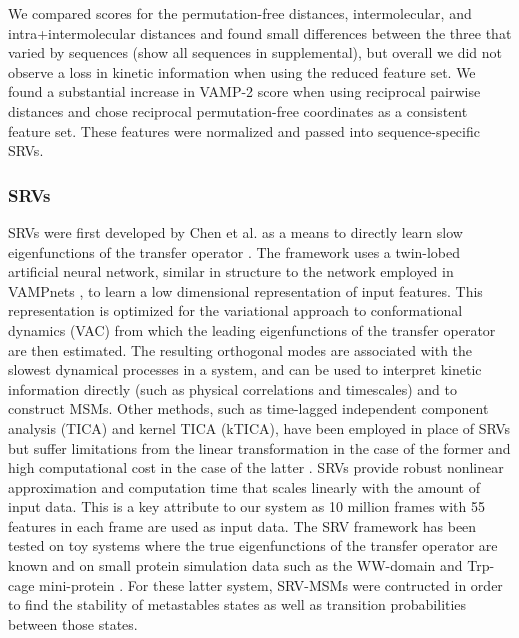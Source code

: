 \documentclass[journal=jpcbfk,manuscript=article]{achemso}
\begin{document}
We compared scores for the permutation-free distances, intermolecular, and intra+intermolecular distances and found small differences between the three that varied by sequences (show all sequences in supplemental), but overall we did not observe a loss in kinetic information when using the reduced feature set. We found a substantial increase in VAMP-2 score when using reciprocal pairwise distances and chose reciprocal permutation-free coordinates as a consistent feature set. These features were normalized and passed into sequence-specific SRVs. 


\subsubsection{\label{sec:methods}SRVs}
 
SRVs were first developed by Chen et al. as a means to directly learn slow eigenfunctions of the transfer operator \citep{Chen}. The framework uses a twin-lobed artificial neural network, similar in structure to the network employed in VAMPnets \citep{Mardt2018VAMPnetsKinetics}, to learn a low dimensional representation of input features. This representation is optimized for the variational approach to conformational dynamics (VAC) from which the leading eigenfunctions of the transfer operator are then estimated. The resulting orthogonal modes are associated with the slowest dynamical processes in a system, and can be used to interpret kinetic information directly (such as physical correlations and timescales) and to construct MSMs. Other methods, such as time-lagged independent component analysis (TICA) and kernel TICA (kTICA), have been employed in place of SRVs but suffer limitations from the linear transformation in the case of the former and high computational cost in the case of the latter \citep{Molgedey1994SeparationCorrelations, Harrigan2017LandmarkDynamics}. SRVs provide robust nonlinear approximation and computation time that scales linearly with the amount of input data. This is a key attribute to our system as 10 million frames with 55 features in each frame are used as input data. The SRV framework has been tested on toy systems where the true eigenfunctions of the transfer operator are known and on small protein simulation data such as the WW-domain and Trp-cage mini-protein \citep{Chen, Sidky}. For these latter system, SRV-MSMs were contructed in order to find the stability of metastables states as well as transition probabilities between those states.
\end{document}
